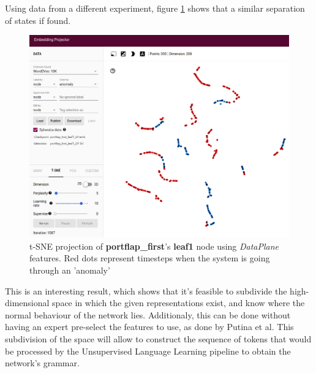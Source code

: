 Using data from a different experiment, figure \ref{fig:portflap_first_leaf1_DP} shows that a similar separation of states if found.
\begin{figure}[h!]
	\centering
	\includegraphics[width=0.8\linewidth]{Figure/portflap_first_leaf1_DP.png}
	\caption{t-SNE projection of \textbf{portflap\_first}'s \textbf{leaf1} node using \textit{DataPlane} features. Red dots represent timesteps when the system is going through an 'anomaly'}
	\label{fig:portflap_first_leaf1_DP}
\end{figure}

This is an interesting result, which shows that it's feasible to subdivide the high-dimensional space in which the given representations exist, and know where the normal behaviour of the network lies.
Additionaly, this can be done without having an expert pre-select the features to use, as done by Putina et al\cite{putina_telemetry-based_2018}.
This subdivision of the space will allow to construct the sequence of tokens that would be processed by the Unsupervised Language Learning pipeline to obtain the network's grammar.


